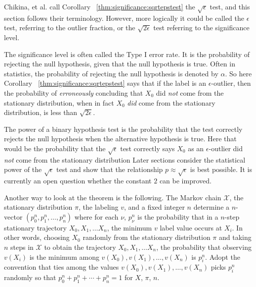 \documentclass[12pt]{article}
\begin{document}
\begin{remark}
    Chikina, et al.
    \cite{Chikina2860} call Corollary~%
    \ref{thm:significance:sqrtepstest} the \( \sqrt{\epsilon} \) test,
    and this section follows their terminology.  However, more logically
    it could be called the \( \epsilon \) test, referring to the outlier
    fraction, or the \( \sqrt{2 \epsilon} \) test referring to the
    significance level.
\end{remark}

\begin{remark}
    The significance level is often called the Type I error rate.%
    It is the probability of rejecting the null hypothesis, given that
    the null hypothesis is true.  Often in statistics, the probability
    of rejecting the null hypothesis is denoted by \( \alpha \).  So
    here Corollary~%
    \ref{thm:significance:sqrtepstest} says that if the label is an \(
    \epsilon \)-outlier, then the probability of \emph{erroneously}
    concluding that \( X_0 \) did \emph{not} come from the stationary
    distribution, when in fact \( X_0 \) \emph{did} come from the stationary
    distribution, is less than \( \sqrt{2 \epsilon } \).
\end{remark}

\begin{remark}
    The power%
    of a binary hypothesis test is the probability that the test
    correctly rejects the null hypothesis when the alternative
    hypothesis is true.  Here that would be the probability that the \(
    \sqrt{\epsilon} \) test correctly says \( X_0 \) as an \( \epsilon \)-outlier
    did \emph{not} come from the stationary distribution Later sections
    consider the statistical power of the \( \sqrt{\epsilon} \) test and
    show that the relationship \( p \approx \sqrt{\epsilon} \) is best
    possible.  It is currently an open question whether the constant \(
    2 \) can be improved.
\end{remark}

Another way to look at the theorem is the following.  The Markov chain \(
\mathcal{X} \), the stationary distribution \( \pi \), the labeling \( v
\), and a fixed integer \( n \) determine a \( n \)-vector \( (p_0^n, p_1^n,
\dots, p_n^n) \) where for each \( \nu \), \( p_{\nu}^n \) is the
probability that in a \( n \)-step stationary trajectory \( X_0, X_1,
\dots X_n \), the minimum \( v \) label value occurs at \( X_i \).  In
other words, choosing \( X_0 \) randomly from the stationary
distribution \( \pi \) and taking \( n \) steps in \( \mathcal{X} \) to
obtain the trajectory \( X_0, X_1, \dots X_n \), the probability that
observing \( v(X_i) \) is the minimum among \( v(X_0), v(X_1), \dots, v(X_n)
\) is \( p_i^n \).  Adopt the convention that ties among the values \( v
(X_0), v(X_1), \dots, v(X_n) \) picks \( p_i^n \) randomly so that \( p_0^n
+ p_1^n + \cdots + p_n^n = 1 \) for \( X \), \( \pi \), \( n \).
\end{document}
